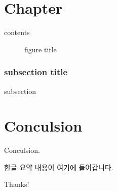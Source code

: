 \documentclass[twoside,phd]{snuthesis_utf8}
\begin{document}
\chapter{Chapter}

contents

\begin{figure}[!hbp]
\caption{figure title}
\end{figure}

\subsection{subsection title}
subsection



\chapter{Conculsion}
Conculsion.


\begin{bibpage}
	
	
\end{bibpage}



\begin{abstractalt}
한글 요약 내용이 여기에 들어갑니다.
\end{abstractalt}

\acknowledgement
Thanks!
\end{document}
